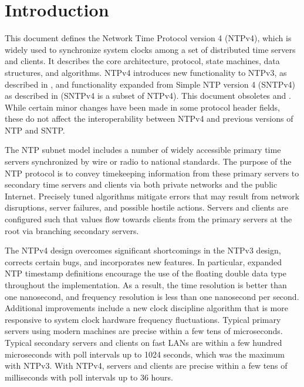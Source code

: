 \chapter{Introduction}

This document defines the Network Time Protocol version 4 (NTPv4),
which is widely used to synchronize system clocks among a set of
distributed time servers and clients. It describes the core
architecture, protocol, state machines, data structures, and
algorithms. NTPv4 introduces new functionality to NTPv3, as
described in \cite{RFC1305}, and functionality expanded from Simple NTP
version 4 (SNTPv4) as described in \cite{RFC4330} (SNTPv4 is a subset of
NTPv4). This document obsoletes \cite{RFC1305} and \cite{RFC4330}. While
certain minor changes have been made in some protocol header fields,
these do not affect the interoperability between NTPv4 and previous
versions of NTP and SNTP.

The NTP subnet model includes a number of widely accessible primary
time servers synchronized by wire or radio to national standards.
The purpose of the NTP protocol is to convey timekeeping information
from these primary servers to secondary time servers and clients via
both private networks and the public Internet. Precisely tuned
algorithms mitigate errors that may result from network disruptions,
server failures, and possible hostile actions. Servers and clients
are configured such that values flow towards clients from the primary
servers at the root via branching secondary servers.

The NTPv4 design overcomes significant shortcomings in the NTPv3
design, corrects certain bugs, and incorporates new features. In
particular, expanded NTP timestamp definitions encourage the use of
the floating double data type throughout the implementation. As a
result, the time resolution is better than one nanosecond, and
frequency resolution is less than one nanosecond per second.
Additional improvements include a new clock discipline algorithm that
is more responsive to system clock hardware frequency fluctuations.
Typical primary servers using modern machines are precise within a
few tens of microseconds. Typical secondary servers and clients on
fast LANs are within a few hundred microseconds with poll intervals
up to 1024 seconds, which was the maximum with NTPv3. With NTPv4,
servers and clients are precise within a few tens of milliseconds
with poll intervals up to 36 hours.


